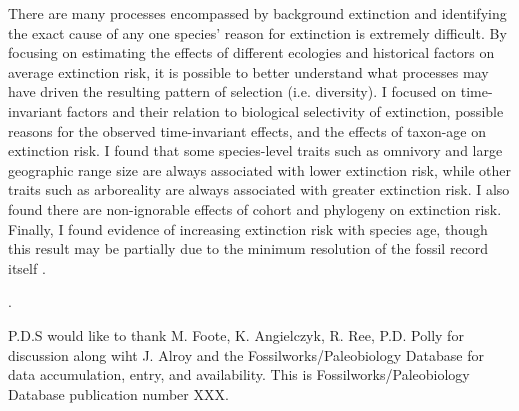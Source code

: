 \documentclass[12pt]{article}
\newcounter{lastnote}
\newenvironment{scilastnote}{%
\setcounter{lastnote}{\value{enumiv}}%
\addtocounter{lastnote}{+1}%
\begin{list}%
{\arabic{lastnote}.}
{\setlength{\leftmargin}{.22in}}
{\setlength{\labelsep}{.5em}}}
{\end{list}}
\begin{document}

There are many processes encompassed by background extinction and identifying the exact cause of any one species' reason for extinction is extremely difficult. By focusing on estimating the effects of different ecologies and historical factors on average extinction risk, it is possible to better understand what processes may have driven the resulting pattern of selection (i.e. diversity). I focused on time-invariant factors and their relation to biological selectivity of extinction, possible reasons for the observed time-invariant effects, and the effects of taxon-age on extinction risk. I found that some species-level traits such as omnivory and large geographic range size are always associated with lower extinction risk, while other traits such as arboreality are always associated with greater extinction risk. I also found there are non-ignorable effects of cohort and phylogeny on extinction risk. Finally, I found evidence of increasing extinction risk with species age, though this result may be partially due to the minimum resolution of the fossil record itself \cite{Sepkoski1975}.





\begin{scilastnote}
\item P.D.S would like to thank M. Foote, K. Angielczyk, R. Ree, P.D. Polly for discussion along wiht J. Alroy and the Fossilworks/Paleobiology Database for data accumulation, entry, and availability. This is Fossilworks/Paleobiology Database publication number XXX.
\end{scilastnote}
\end{document}
